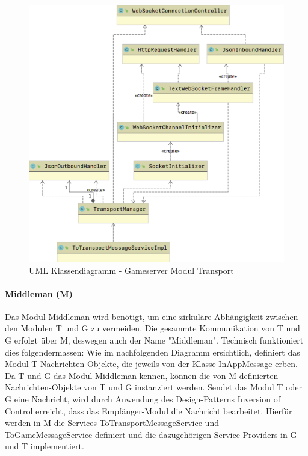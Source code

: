 \documentclass[11pt,ngerman]{article}
\begin{document}
	\begin{figure}[H]
    	\centering
    	\includegraphics[scale=0.3]{figures/gameserver-uml/transport-classes.png}
    	\caption{UML Klassendiagramm - Gameserver Modul Transport}
    	\label{fig:UMLModulTransport}
    \end{figure}

	\paragraph{Middleman (M)}

	Das Modul Middleman wird benötigt, um eine zirkuläre Abhängigkeit zwischen den Modulen T und G zu vermeiden. Die gesammte Kommunikation von T und G erfolgt über M, deswegen auch der Name "Middleman". Technisch funktioniert dies folgendermassen: Wie im nachfolgenden Diagramm ersichtlich, definiert das Modul T Nachrichten-Objekte, die jeweils von der Klasse InAppMessage erben. Da T und G das Modul Middleman kennen, können die von M definierten Nachrichten-Objekte von T und G instanziert werden. Sendet das Modul T oder G eine Nachricht, wird durch Anwendung des Design-Patterns Inversion of Control erreicht, dass das Empfänger-Modul die Nachricht bearbeitet. Hierfür werden in M die Services ToTransportMessageService und ToGameMessageService definiert und die dazugehörigen Service-Providers in G und T implementiert.
\end{document}
